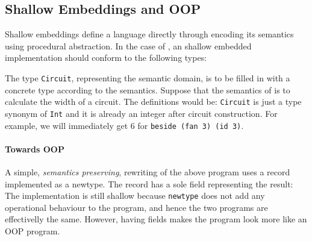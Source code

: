 \subsection{Shallow Embeddings and OOP}
Shallow embeddings define a language directly through encoding its semantics
using procedural abstraction. In the case of \dsl,
an shallow embedded implementation should conform to the following
types:

The type \lstinline{Circuit}, representing the semantic domain, is to be filled in with a concrete type according to the semantics.
Suppose that the semantics of \dsl is to calculate the width of a
circuit. The definitions would be:
\lstinline{Circuit} is just a type
synonym of \lstinline{Int} and it is already an integer after circuit construction.
For example, we will immediately get $6$ for \lstinline{beside (fan 3) (id 3)}.

\begin{comment}

A simple rewriting of the previous program is to wrap the result into an
datatype, getting back the value through pattern matching:

\end{comment}

\paragraph{Towards OOP}
A simple, \emph{semantics preserving}, rewriting of the above program 
uses a record implemented as a newtype. The record has a sole field representing the result:
The implementation is still shallow because \lstinline{newtype} does not add any operational
behaviour to the program, and hence the two programs are effectivelly the
same.  However, having fields makes the program look more like an 
OOP program.

